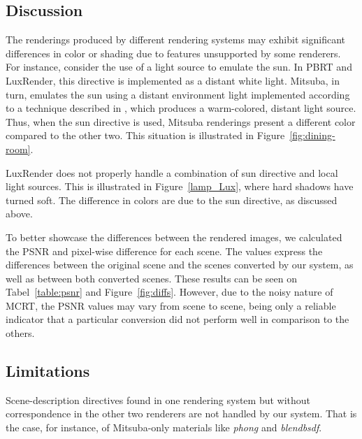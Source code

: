 \subsection{Discussion}
\label{subsec:discussion}

The renderings produced by different rendering systems may exhibit significant differences in color or shading due to features unsupported by some renderers.  
For instance, consider the use of a light source to emulate the sun. In PBRT and LuxRender, this directive is implemented as a distant white light.
Mitsuba, in turn, emulates the sun using a distant environment light implemented according to a technique 
described in \cite{Preetham}, which produces a warm-colored, distant light source. Thus, when the sun directive is used, Mitsuba renderings present a different color compared to the other two. This situation is illustrated in Figure~\ref{fig:dining-room}.

LuxRender does not properly handle a combination of sun directive and local light sources. This is illustrated in Figure~\ref{lamp_Lux}, where hard shadows have turned soft. The difference in colors are due to the sun directive, as discussed above.

To better showcase the differences between the rendered images, we calculated the PSNR and pixel-wise difference for each scene. The values express the differences between the original scene and the scenes converted by our system, as well as between both converted scenes. These results can be seen on Tabel~\ref{table:psnr} and Figure~\ref{fig:diffs}. However, due to the noisy nature of MCRT, the PSNR values may vary from scene to scene, being only a reliable indicator that a particular conversion did not perform well in comparison to the others.



\subsection{Limitations}
Scene-description directives found in one rendering system but without correspondence in the other two renderers are not handled by our system. That is the case, for instance, of Mitsuba-only materials like \textit{phong} and \textit{blendbsdf}. 

